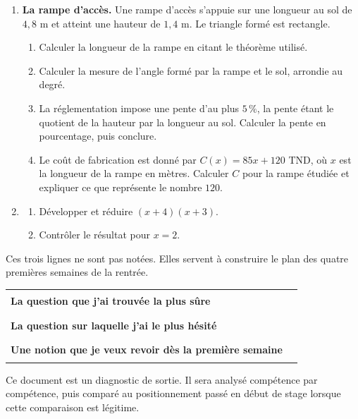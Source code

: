 \documentclass[10pt,a4paper]{article}
\begin{document}
\needspace{68mm}\par\vspace{3mm}
\begin{enumerate}
\needspace{22mm}
\item[\textbf{C1.}] \textbf{La rampe d'accès.} Une rampe d'accès s'appuie sur une longueur au sol de $4{,}8$ m
et atteint une hauteur de $1{,}4$ m. Le triangle formé est rectangle.
\begin{enumerate}
\item Calculer la longueur de la rampe en citant le théorème utilisé.
\item Calculer la mesure de l'angle formé par la rampe et le sol, arrondie au degré.
\item La réglementation impose une pente d'au plus $5\,\%$, la pente étant le quotient de la hauteur par la
longueur au sol. Calculer la pente en pourcentage, puis conclure.
\item Le coût de fabrication est donné par $C(x) = 85x + 120$ TND, où $x$ est la longueur de la rampe en mètres.
Calculer $C$ pour la rampe étudiée et expliquer ce que représente le nombre $120$.
\end{enumerate}
\par\vspace{1.2mm}
\needspace{22mm}
\item[\textbf{C2.}] \begin{enumerate}
\item Développer et réduire $(x + 4)(x + 3)$.
\item Contrôler le résultat pour $x = 2$.
\end{enumerate}
\par\vspace{1.2mm}
\end{enumerate}
\brouillon{\dimexpr\textheight/3\relax}
\newpage
{}
\begin{methodbox}Ces trois lignes ne sont pas notées. Elles servent à construire le plan des quatre premières semaines de la rentrée.\end{methodbox}
\par\noindent\begin{tabularx}{\linewidth}{>{\bfseries}p{62mm} X}
\toprule
La question que j'ai trouvée la plus sûre & \rule{85mm}{0.32pt} \\
La question sur laquelle j'ai le plus hésité & \rule{85mm}{0.32pt} \\
Une notion que je veux revoir dès la première semaine & \rule{85mm}{0.32pt} \\
\bottomrule\end{tabularx}
\vfill
\begin{graybox}\small Ce document est un diagnostic de sortie. Il sera analysé compétence par compétence, puis comparé au positionnement passé en début de stage lorsque cette comparaison est légitime.\end{graybox}
\end{document}
